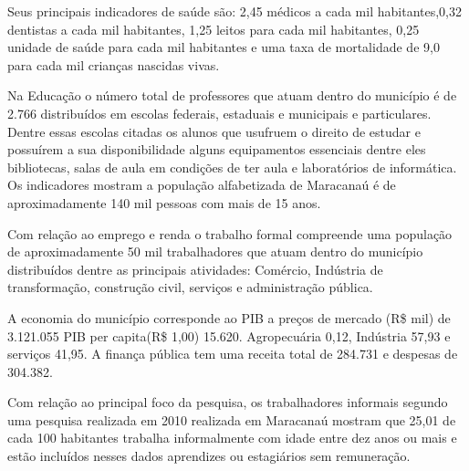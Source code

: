 Seus principais indicadores de saúde são: 2,45 médicos a cada mil habitantes,0,32 dentistas a cada mil
habitantes, 1,25 leitos para cada mil habitantes, 0,25 unidade de saúde para cada mil habitantes e uma 
taxa de mortalidade de 9,0 para cada mil crianças nascidas vivas.

Na Educação o número total de professores que atuam dentro do município é de 2.766 distribuídos em escolas 
federais, estaduais e municipais e particulares. Dentre essas escolas citadas os alunos que usufruem o
direito de estudar e possuírem a sua disponibilidade alguns equipamentos essenciais dentre eles bibliotecas,
salas de aula em condições de ter aula e laboratórios de informática. Os indicadores mostram a população 
alfabetizada de Maracanaú é de aproximadamente 140 mil pessoas com mais de 15 anos.

Com relação ao emprego e renda o trabalho formal compreende uma população de aproximadamente 50 mil
trabalhadores que atuam dentro do município distribuídos dentre as principais atividades: Comércio, 
Indústria de transformação, construção civil, serviços e administração pública.

A economia do município corresponde ao PIB a preços de mercado (R\$ mil) de 3.121.055 PIB per capita(R\$ 1,00) 
15.620. Agropecuária 0,12, Indústria 57,93 e serviços 41,95. A finança pública tem uma receita total de 284.731 
e despesas de 304.382.

Com relação ao principal foco da pesquisa, os trabalhadores informais segundo uma pesquisa realizada em 2010 
realizada em Maracanaú mostram que 25,01 de cada 100 habitantes trabalha informalmente com idade entre dez anos 
ou mais e estão incluídos nesses dados aprendizes ou estagiários sem remuneração.
